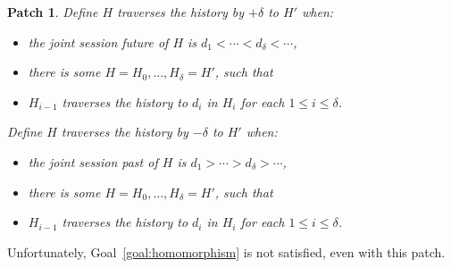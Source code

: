 \documentclass{article}
\newcommand{\aNH}{H}
\newcommand{\ltChron}{<}
\newcommand{\gtChron}{>}
\newcommand{\aDoc}{d}
\newtheorem{patch}{Patch}
\begin{document}
\begin{patch}
Define \emph{$\aNH$ traverses the history by $+\delta$ to $\aNH'$} when:
\begin{itemize}
\item the joint session future of $\aNH$ is $\aDoc_1 \ltChron \cdots \ltChron \aDoc_\delta \ltChron \cdots$,
\item there is some $\aNH=\aNH_0,\ldots,\aNH_\delta=\aNH'$, such that
\item $H_{i-1}$ traverses the history to $d_i$ in $H_i$ for each $1 \le i \le \delta$.
\end{itemize}
Define \emph{$\aNH$ traverses the history by $-\delta$ to $\aNH'$} when:
\begin{itemize}
\item the joint session past of $\aNH$ is $\aDoc_1 \gtChron \cdots \gtChron \aDoc_\delta \gtChron \cdots$,
\item there is some $\aNH=\aNH_0,\ldots,\aNH_\delta=\aNH'$, such that
\item $H_{i-1}$ traverses the history to $d_i$ in $H_i$ for each $1 \le i \le \delta$.
\end{itemize}
\end{patch}
Unfortunately, Goal~\ref{goal:homomorphism} is not satisfied,
even with this patch.
\end{document}
